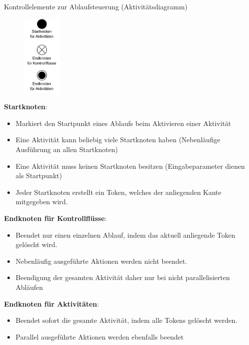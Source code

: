 \begin{diag}{Kontrollelemente zur Ablaufsteuerung (Aktivitätsdiagramm)}
    \begin{figure}
        \centering
        \includegraphics[width=0.175\textwidth]{includes/figures/defi_diagrams_activity_start_end.pdf}
    \end{figure}
    \textbf{Startknoten}:
    \begin{itemize}
        \item Markiert den Startpunkt eines Ablaufs beim Aktivieren einer Aktivität
        \item Eine Aktivität kann beliebig viele Startknoten haben (Nebenläufige Ausführung an allen Startknoten)
        \item Eine Aktivität muss keinen Startknoten besitzen (Eingabeparameter dienen als Startpunkt)
        \item Jeder Startknoten erstellt ein Token, welches der anliegenden Kante mitgegeben wird.
    \end{itemize}

    \textbf{Endknoten für Kontrollflüsse}:
    \begin{itemize}
        \item Beendet nur einen einzelnen Ablauf, indem das aktuell anliegende Token gelöscht wird.
        \item Nebenläufig ausgeführte Aktionen werden nicht beendet.
        \item Beendigung der gesamten Aktivität daher nur bei nicht parallelisierten Abläufen
    \end{itemize}

    \textbf{Endknoten für Aktivitäten}:
    \begin{itemize}
        \item Beendet sofort die gesamte Aktivität, indem alle Tokens gelöscht werden.
        \item Parallel ausgeführte Aktionen werden ebenfalls beendet
    \end{itemize}
\end{diag}

